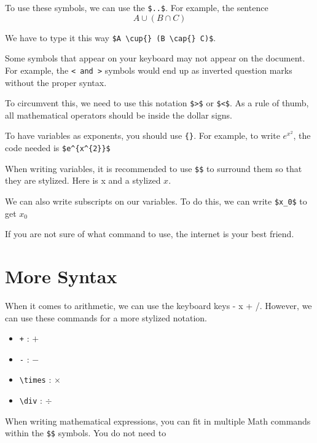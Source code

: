 \documentclass[11pt]{article}
\begin{document}
To use these symbols, we can use the \verb|$..$|. For example, the sentence \[A \cup{} (B \cap{} C)\]

We have to type it this way \verb|$A \cup{} (B \cap{} C)$|. 
\vspace{3mm}

Some symbols that appear on your keyboard may not appear on the document. For example, the \verb|< and >| symbols would end up as inverted question marks without the proper syntax. 
\vspace{3mm}

To circumvent this, we need to use this notation \verb|$>$| or \verb|$<$|. As a rule of thumb, all mathematical operators should be inside the dollar signs.
\vspace{3mm}

To have variables as exponents, you should use \verb|{}|. For example, to write $e^{x^{2}}$, the code needed is \verb|$e^{x^{2}}$|
\vspace{3mm}

When writing variables, it is recommended to use \verb|$$| to surround them so that they are stylized. Here is x and a stylized $x$.
\vspace{3mm}

We can also write subscripts on our variables. To do this, we can write \verb|$x_0$| to get $x_0$
\vspace{3mm}

If you are not sure of what command to use, the internet is your best friend.

\section{More Syntax}
When it comes to arithmetic, we can use the keyboard keys - x + /. However, we can use these commands for a more stylized notation.

\begin{itemize}
    \item \verb|+| : $+$
    \item \verb|-| : $-$
    \item \verb|\times| : $\times$
    \item \verb|\div| : $\div$
\end{itemize}

When writing mathematical expressions, you can fit in multiple Math commands within the \verb|$$| symbols. You do not need to 
\vspace{3mm}
\end{document}
